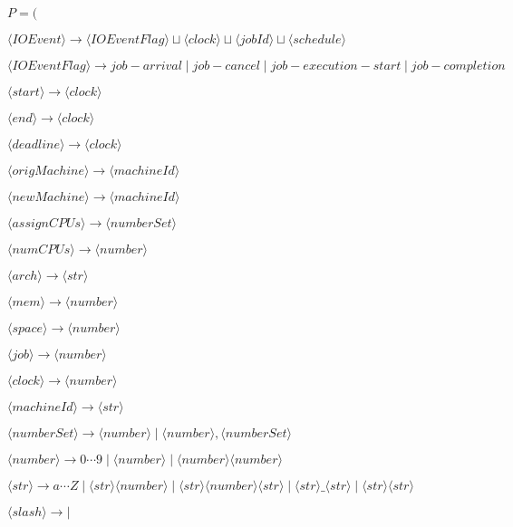 \documentclass[draft]{fithesis}
\begin{document}
\begin{list}{}{$P = ($}
	\item $\langle IOEvent \rangle 
		\longrightarrow 
		\langle IOEventFlag \rangle \sqcup \langle clock \rangle \sqcup \langle jobId \rangle \sqcup \langle schedule \rangle$
	\item $\langle IOEventFlag \rangle 
		\longrightarrow 
		job-arrival \mid job-cancel \mid job-execution-start \mid job-completion$
	\item $\langle start \rangle 
		\longrightarrow 
		\langle clock \rangle$
	\item $\langle end \rangle 
		\longrightarrow 
		\langle clock \rangle$
	\item $\langle deadline \rangle 
		\longrightarrow 
		\langle clock \rangle$
	\item $\langle origMachine \rangle 
		\longrightarrow 
		\langle machineId \rangle$
	\item $\langle newMachine \rangle 
		\longrightarrow 
		\langle machineId \rangle$
	\item $\langle assignCPUs \rangle 
		\longrightarrow 
		\langle numberSet \rangle$
	\item $\langle numCPUs \rangle 
		\longrightarrow
		\langle number \rangle$
	\item $\langle arch \rangle 
		\longrightarrow 
		\langle str \rangle$
	\item $\langle mem \rangle 
		\longrightarrow 
		\langle number \rangle$
	\item $\langle space \rangle 
		\longrightarrow 
		\langle number \rangle$
	\item $\langle job \rangle 
		\longrightarrow 
		\langle number \rangle$
	\item $\langle clock \rangle 
		\longrightarrow 
		\langle number \rangle$
	\item $\langle machineId \rangle 
		\longrightarrow 
		\langle str \rangle$
	\item $\langle numberSet \rangle 
		\longrightarrow 
		\langle number \rangle \mid \langle number \rangle , \langle numberSet \rangle$
	\item $\langle number \rangle 
		\longrightarrow 
		0 \cdots 9 \mid \langle number \rangle \mid \langle number \rangle \langle number \rangle$
	\item $\langle str \rangle 
		\longrightarrow 
		a \cdots Z \mid \langle str \rangle \langle number \rangle \mid \langle str \rangle \langle number \rangle \langle str \rangle \mid \langle str \rangle \_ \langle str \rangle \mid \langle str \rangle \langle str \rangle$
	\item $\langle slash \rangle 
		\longrightarrow 
		|$
\end{list}
\end{document}
